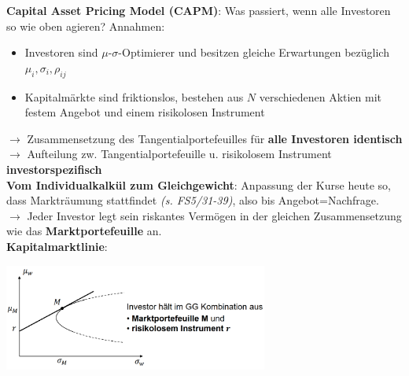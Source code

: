 \bigskip
\textbf{Capital Asset Pricing Model (CAPM)}: Was passiert, wenn alle Investoren so wie oben agieren?
Annahmen:
\begin{itemize}
	\item Investoren sind $\mu\text{-}\sigma$-Optimierer und besitzen gleiche Erwartungen bezüglich $\mu_i,\sigma_i,\rho_{ij}$
	\item Kapitalmärkte sind friktionslos, bestehen aus $N$ verschiedenen Aktien mit festem Angebot und einem risikolosen Instrument
\end{itemize}
$\rightarrow$ Zusammensetzung des Tangentialportefeuilles für \textbf{alle Investoren identisch}\\
$\rightarrow$ Aufteilung zw. Tangentialportefeuille u. risikolosem Instrument \textbf{investorspezifisch}\\

\textbf{Vom Individualkalkül zum Gleichgewicht}:
Anpassung der Kurse heute so, dass Markträumung stattfindet \textit{(s. FS5/31-39)}, also bis Angebot=Nachfrage.\\
$\rightarrow$ Jeder Investor legt sein riskantes Vermögen in der gleichen Zusammensetzung wie das \textbf{Marktportefeuille} an.\\

\textbf{Kapitalmarktlinie}: 
\begin{center}
	\includegraphics[width=0.65\textwidth]{images/marktpf.png}
\end{center}

